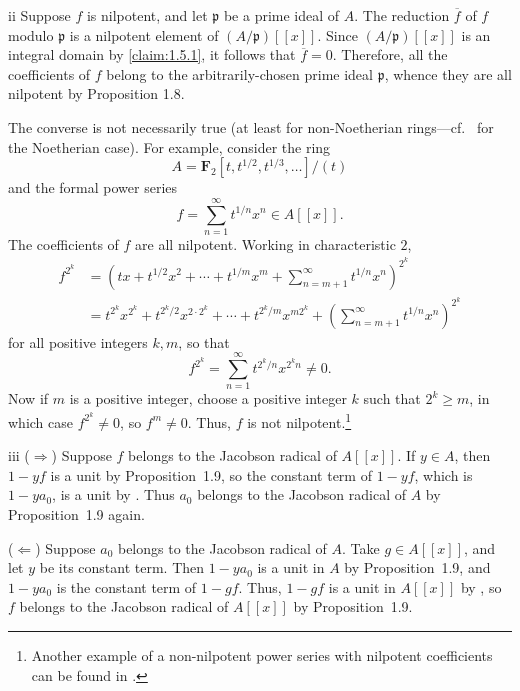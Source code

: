 \begin{partsolution}{ii}
Suppose \(f\) is nilpotent, and let \(\mathfrak p\) be a prime ideal of \(A\).
The reduction \(\overline f\) of \(f\) modulo \(\mathfrak p\) is a nilpotent element of \((A/\mathfrak p)[[x]]\).
Since \((A/\mathfrak p)[[x]]\) is an integral domain by \autoref{claim:1.5.1}, it follows that \(\overline f = 0\).
Therefore, all the coefficients of \(f\) belong to the arbitrarily-chosen prime ideal \(\mathfrak p\), whence they are all nilpotent by Proposition 1.8.

The converse is not necessarily true (at least for non-Noetherian rings---cf.~ for the Noetherian case).
For example, consider the ring
\begin{equation*}
A = \mathbf{F}_2[t, t^{1/2}, t^{1/3}, \ldots]/(t)
\end{equation*}
and the formal power series
\begin{equation*}
f = \sum_{n=1}^\infty t^{1/n} x^n \in A[[x]].
\end{equation*}
The coefficients of \(f\) are all nilpotent.
Working in characteristic \(2\),
\begin{align*}
f^{2^k}
&= \left(t x + t^{1/2} x^2 + \cdots + t^{1/m} x^m + \sum_{n = m + 1}^\infty t^{1/n} x^n\right)^{2^k}
\\&= t^{2^k} x^{2^k} + t^{2^k / 2} x^{2\cdot2^k} + \cdots + t^{2^k / m} x^{m 2^k} + \left(\sum_{n = m+1}^\infty t^{1/n} x^n\right)^{2^k}
\end{align*}
for all positive integers \(k, m\), so that
\begin{equation*}
f^{2^k}
= \sum_{n=1}^\infty t^{2^k/n} x^{2^k n} \neq 0.
\end{equation*}
Now if \(m\) is a positive integer, choose a positive integer \(k\) such that \(2^k \geq m\), in which case \(f^{2^k} \neq 0\), so \(f^m \neq 0\).
Thus, \(f\) is not nilpotent.\footnote{%
Another example of a non-nilpotent power series with nilpotent coefficients can be found in \cite[Example 2]{FieldsZeroDivisors}.%
}
\end{partsolution}

\begin{partsolution}{iii}
(\(\Rightarrow\))
Suppose \(f\) belongs to the Jacobson radical of \(A[[x]]\).
If \(y \in A\), then \(1 - y f\) is a unit by Proposition~1.9, so the constant term of \(1 - y f\), which is \(1 - y a_0\), is a unit by .
Thus \(a_0\) belongs to the Jacobson radical of \(A\) by Proposition~1.9 again.

(\(\Leftarrow\))
Suppose \(a_0\) belongs to the Jacobson radical of \(A\).
Take \(g \in A[[x]]\), and let \(y\) be its constant term.
Then \(1 - y a_0\) is a unit in \(A\) by Proposition~1.9, and \(1 - y a_0\) is the constant term of \(1 - g f\).
Thus, \(1 - g f\) is a unit in \(A[[x]]\) by , so \(f\) belongs to the Jacobson radical of \(A[[x]]\) by Proposition~1.9.
\end{partsolution}

